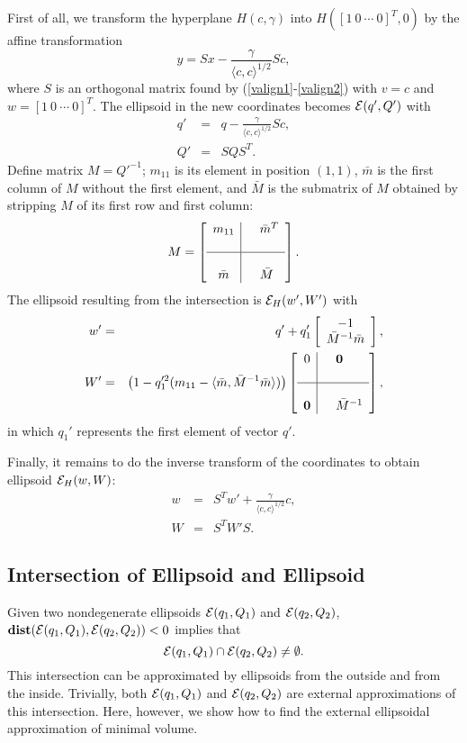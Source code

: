 First of all, we transform the hyperplane $H(c,\gamma)$
into $H([1~0~\cdots~0]^T, 0)$ by the affine transformation
\[ y = Sx - \frac{\gamma}{\langle c,c\rangle^{1/2}}Sc, \]
where $S$ is an orthogonal matrix found by (\ref{valign1}-\ref{valign2}) with
$v=c$ and $w=[1~0~\cdots~0]^T$.
The ellipsoid in the new coordinates becomes $\EE(q',Q')$ with
\begin{eqnarray*}
q' & = & q-\frac{\gamma}{\langle c,c\rangle^{1/2}}Sc, \\
Q' & = & SQS^T.
\end{eqnarray*}
Define matrix $M=Q'^{-1}$; $m_{11}$ is its element in position $(1,1)$,
$\bar{m}$ is the first column of  $M$ without the first element,
and $\bar{M}$ is the submatrix of $M$ obtained by stripping $M$ of its
first row and first column:
\[ M = \left[\begin{array}{c|cl}
m_{11} & & \bar{m}^T\\
 & \\
\hline
 & \\
\bar{m} & & \bar{M}\end{array}\right]. \]
The ellipsoid resulting from the intersection is $\EE_H(w',W')$ with
\begin{eqnarray*}
w' & = & q' + q_1'\left[\begin{array}{c}
-1\\
\bar{M}^{-1}\bar{m}\end{array}\right],\\
W' & = & \left(1-q_1'^2(m_{11}-
\langle\bar{m},\bar{M}^{-1}\bar{m}\rangle)\right)\left[\begin{array}{c|cl}
0 & & {\bf 0}\\
 & \\
\hline
 & \\
{\bf 0} & & \bar{M}^{-1}\end{array}\right],
\end{eqnarray*}
in which $q_1'$ represents the first element of vector $q'$.

Finally, it remains to do the inverse transform of the coordinates
to obtain ellipsoid $\EE_H(w,W)$:
\begin{eqnarray*}
w & = & S^Tw' + \frac{\gamma}{\langle c,c\rangle^{1/2}}c, \\
W & = & S^TW'S.
\end{eqnarray*}










\subsection{Intersection of Ellipsoid and Ellipsoid}
Given two nondegenerate ellipsoids $\EE(q_1,Q_1)$ and $\EE(q_2,Q_2)$,
${\bf dist}(\EE(q_1,Q_1),\EE(q_2,Q_2))<0$ implies that
\[ \EE(q_1,Q_1)\cap\EE(q_2,Q_2)\neq\emptyset .\]
This intersection can be approximated by ellipsoids from the outside and
from the inside.
Trivially, both  $\EE(q_1,Q_1)$ and $\EE(q_2,Q_2)$ are external approximations
of this intersection.
Here, however, we show how to find the external ellipsoidal approximation
of minimal volume.

